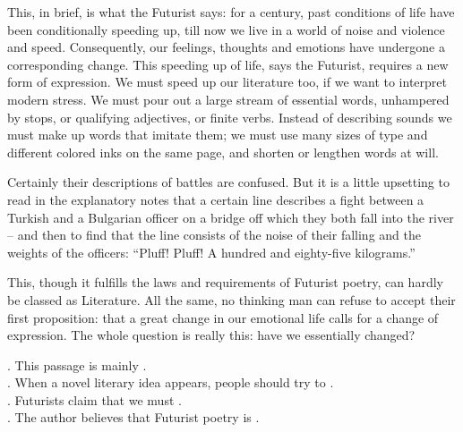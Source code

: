 This, in brief, is what the Futurist says: for a century, past conditions of life have been conditionally speeding up, till now we live in a world of noise and violence and speed. Consequently, our feelings, thoughts and emotions have undergone a corresponding change. This speeding up of life, says the Futurist, requires a new form of expression. We must speed up our literature too, if we want to interpret modern stress. We must pour out a large stream of essential words, unhampered by stops, or qualifying adjectives, or finite verbs. Instead of describing sounds we must make up words that imitate them; we must use many sizes of type and different colored inks on the same page, and shorten or lengthen words at will.

Certainly their descriptions of battles are confused. But it is a little upsetting to read in the explanatory notes that a certain line describes a fight between a Turkish and a Bulgarian officer on a bridge off which they both fall into the river -- and then to find that the line consists of the noise of their falling and the weights of the officers: “Pluff! Pluff! A hundred and eighty-five kilograms.”

This, though it fulfills the laws and requirements of Futurist poetry, can hardly be classed as Literature. All the same, no thinking man can refuse to accept their first proposition: that a great change in our emotional life calls for a change of expression. The whole question is really this: have we essentially changed?

\begin{questions}  .	This passage is mainly \ltk{}.\\
 .	When a novel literary idea appears, people should try to \ltk{}.\\
 .	Futurists claim that we must \ltk{}.\\
 .	The author believes that Futurist poetry is \ltk{}.\\
\end{questions}    

